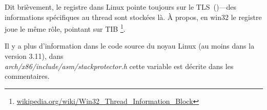 Dit brièvement, le registre  dans Linux pointe toujours sur le
\ac{TLS}~()---des informations spécifiques au thread sont stockées là.
À propos, en win32 le registre  joue le même rôle, pointant sur \ac{TIB}
\footnote{\href{http://go.yurichev.com/17104}{wikipedia.org/wiki/Win32\_Thread\_Information\_Block}}.

Il y a plus d'information dans le code source du noyau Linux (au moins dans la version 3.11),
dans\\
\emph{arch/x86/include/asm/stackprotector.h} cette variable est décrite dans les commentaires.



